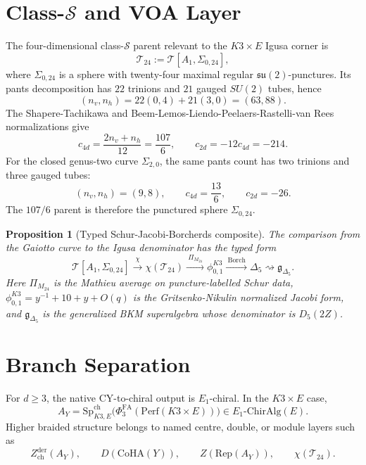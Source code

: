 \documentclass[11pt]{article}
\newtheorem{proposition}[theorem]{Proposition}
\providecommand{\cS}{\mathcal{S}}
\providecommand{\cT}{\mathcal{T}}
\providecommand{\fg}{\mathfrak{g}}
\providecommand{\fsu}{\mathfrak{su}}
\providecommand{\Borch}{\mathrm{Borch}}
\providecommand{\ChirAlg}{\mathrm{ChirAlg}}
\providecommand{\CoHA}{\mathrm{CoHA}}
\providecommand{\Perf}{\mathrm{Perf}}
\providecommand{\SpCh}{\mathrm{Sp}^{\mathrm{ch}}}
\providecommand{\PhiFA}{\Phi^{\mathrm{FA}}}
\providecommand{\Dfive}{\Delta_5}
\begin{document}
\section{Class-\texorpdfstring{\(\cS\)}{S} and VOA Layer}

The four-dimensional class-\(\cS\) parent relevant to the \(K3\times E\)
Igusa corner is
\[
  \cT_{24}:=\cT[A_1,\Sigma_{0,24}],
\]
where \(\Sigma_{0,24}\) is a sphere with twenty-four maximal regular
\(\fsu(2)\)-punctures.  Its pants decomposition has \(22\) trinions and
\(21\) gauged \(SU(2)\) tubes, hence
\[
  (n_v,n_h)=22(0,4)+21(3,0)=(63,88).
\]
The Shapere-Tachikawa and Beem-Lemos-Liendo-Peelaers-Rastelli-van Rees
normalizations give
\[
  c_{4d}=\frac{2n_v+n_h}{12}=\frac{107}{6},
  \qquad
  c_{2d}=-12c_{4d}=-214.
\]
For the closed genus-two curve \(\Sigma_{2,0}\), the same pants count
has two trinions and three gauged tubes:
\[
  (n_v,n_h)=(9,8),
  \qquad
  c_{4d}=\frac{13}{6},
  \qquad
  c_{2d}=-26.
\]
The \(107/6\) parent is therefore the punctured sphere
\(\Sigma_{0,24}\).

\begin{proposition}[Typed Schur-Jacobi-Borcherds composite]
\label{prop:schur-jacobi-borcherds}
The comparison from the Gaiotto curve to the Igusa denominator has the
typed form
\[
  \cT[A_1,\Sigma_{0,24}]
  \xrightarrow{\ \chi\ }
  \chi(\cT_{24})
  \xrightarrow{\ \Pi_{M_{24}}\ }
  \phi_{0,1}^{K3}
  \xrightarrow{\ \Borch\ }
  \Dfive
  \rightsquigarrow
  \fg_{\Dfive}.
\]
Here \(\Pi_{M_{24}}\) is the Mathieu average on puncture-labelled Schur
data, \(\phi_{0,1}^{K3}=y^{-1}+10+y+O(q)\) is the
Gritsenko-Nikulin normalized Jacobi form, and
\(\fg_{\Dfive}\) is the generalized BKM superalgebra whose denominator
is \(D_5(2Z)\).
\end{proposition}

\section{Branch Separation}

For \(d\geq3\), the native CY-to-chiral output is \(E_1\)-chiral.  In
the \(K3\times E\) case,
\[
  A_Y=
  \SpCh_{K3,E}\bigl(\PhiFA_3(\Perf(K3\times E))\bigr)
  \in E_1\text{-}\ChirAlg(E).
\]
Higher braided structure belongs to named centre, double, or module
layers such as
\[
  Z^{\mathrm{der}}_{\mathrm{ch}}(A_Y),
  \qquad
  D(\CoHA(Y)),
  \qquad
  Z(\mathrm{Rep}(A_Y)),
  \qquad
  \chi(\cT_{24}).
\]
\end{document}
